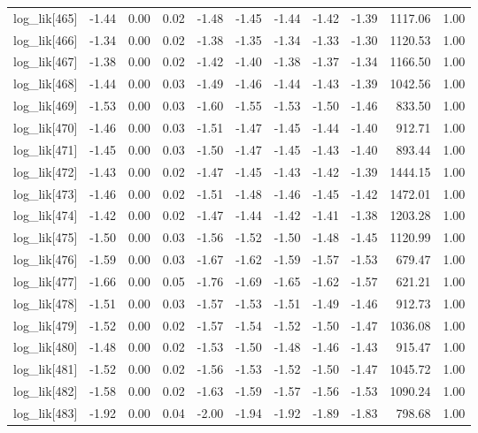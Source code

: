 \begin{table}[ht]
\begin{tabular}{rrrrrrrrrrr}
  log\_lik[465] & -1.44 & 0.00 & 0.02 & -1.48 & -1.45 & -1.44 & -1.42 & -1.39 & 1117.06 & 1.00 \\ 
  log\_lik[466] & -1.34 & 0.00 & 0.02 & -1.38 & -1.35 & -1.34 & -1.33 & -1.30 & 1120.53 & 1.00 \\ 
  log\_lik[467] & -1.38 & 0.00 & 0.02 & -1.42 & -1.40 & -1.38 & -1.37 & -1.34 & 1166.50 & 1.00 \\ 
  log\_lik[468] & -1.44 & 0.00 & 0.03 & -1.49 & -1.46 & -1.44 & -1.43 & -1.39 & 1042.56 & 1.00 \\ 
  log\_lik[469] & -1.53 & 0.00 & 0.03 & -1.60 & -1.55 & -1.53 & -1.50 & -1.46 & 833.50 & 1.00 \\ 
  log\_lik[470] & -1.46 & 0.00 & 0.03 & -1.51 & -1.47 & -1.45 & -1.44 & -1.40 & 912.71 & 1.00 \\ 
  log\_lik[471] & -1.45 & 0.00 & 0.03 & -1.50 & -1.47 & -1.45 & -1.43 & -1.40 & 893.44 & 1.00 \\ 
  log\_lik[472] & -1.43 & 0.00 & 0.02 & -1.47 & -1.45 & -1.43 & -1.42 & -1.39 & 1444.15 & 1.00 \\ 
  log\_lik[473] & -1.46 & 0.00 & 0.02 & -1.51 & -1.48 & -1.46 & -1.45 & -1.42 & 1472.01 & 1.00 \\ 
  log\_lik[474] & -1.42 & 0.00 & 0.02 & -1.47 & -1.44 & -1.42 & -1.41 & -1.38 & 1203.28 & 1.00 \\ 
  log\_lik[475] & -1.50 & 0.00 & 0.03 & -1.56 & -1.52 & -1.50 & -1.48 & -1.45 & 1120.99 & 1.00 \\ 
  log\_lik[476] & -1.59 & 0.00 & 0.03 & -1.67 & -1.62 & -1.59 & -1.57 & -1.53 & 679.47 & 1.00 \\ 
  log\_lik[477] & -1.66 & 0.00 & 0.05 & -1.76 & -1.69 & -1.65 & -1.62 & -1.57 & 621.21 & 1.00 \\ 
  log\_lik[478] & -1.51 & 0.00 & 0.03 & -1.57 & -1.53 & -1.51 & -1.49 & -1.46 & 912.73 & 1.00 \\ 
  log\_lik[479] & -1.52 & 0.00 & 0.02 & -1.57 & -1.54 & -1.52 & -1.50 & -1.47 & 1036.08 & 1.00 \\ 
  log\_lik[480] & -1.48 & 0.00 & 0.02 & -1.53 & -1.50 & -1.48 & -1.46 & -1.43 & 915.47 & 1.00 \\ 
  log\_lik[481] & -1.52 & 0.00 & 0.02 & -1.56 & -1.53 & -1.52 & -1.50 & -1.47 & 1045.72 & 1.00 \\ 
  log\_lik[482] & -1.58 & 0.00 & 0.02 & -1.63 & -1.59 & -1.57 & -1.56 & -1.53 & 1090.24 & 1.00 \\ 
  log\_lik[483] & -1.92 & 0.00 & 0.04 & -2.00 & -1.94 & -1.92 & -1.89 & -1.83 & 798.68 & 1.00 \\ 

\end{tabular}
\end{table}
